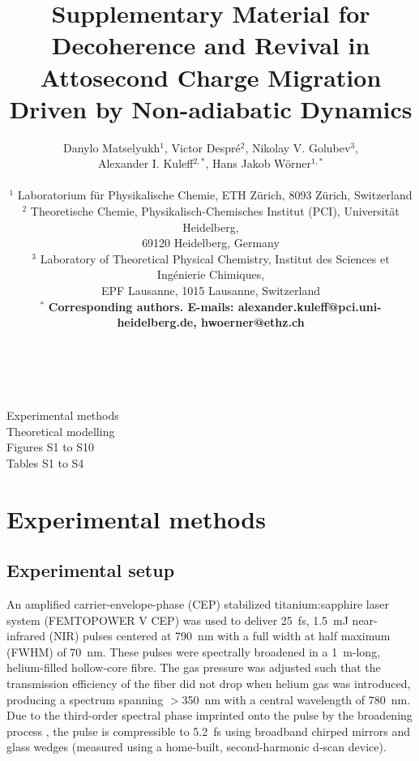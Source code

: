 \documentclass[12pt]{article}
\title{Supplementary Material for
\\ \bf Decoherence and Revival in Attosecond Charge Migration Driven by Non-adiabatic Dynamics}
\author
{Danylo Matselyukh$^1$, Victor Despr\'e$^2$, Nikolay V. Golubev$^3$, \\
Alexander I. Kuleff$^{2,\ast}$, Hans Jakob W{\"o}rner$^{1,\ast}$\\
 \\
\normalsize{$^{1}$ Laboratorium f\"{u}r Physikalische Chemie, ETH Z\"{u}rich, 8093 Z\"{u}rich, Switzerland}\\
\normalsize{$^{2}$ Theoretische Chemie, Physikalisch-Chemisches Institut (PCI), Universit\"at Heidelberg,}\\
\normalsize{69120 Heidelberg, Germany}\\
\normalsize{$^{3}$ Laboratory of Theoretical Physical Chemistry, Institut des Sciences et Ing\'enierie Chimiques,} \\
\normalsize{EPF Lausanne, 1015 Lausanne, Switzerland}\\
\normalsize{$^\ast$ \textbf{Corresponding authors. E-mails: alexander.kuleff@pci.uni-heidelberg.de, hwoerner@ethz.ch}}\\
\\
}
\date{}
\begin{document}
\baselineskip24pt

\maketitle

\\
\noindent Experimental methods\\
Theoretical modelling \\
Figures S1 to S10 \\
Tables S1 to S4 \\

\newpage
\tableofcontents

\renewcommand{\thefigure}{S\arabic{figure}}
\renewcommand{\thetable}{S\arabic{table}}
\renewcommand{\thesection}{S\arabic{section}}

\clearpage
\section{Experimental methods}

\subsection{Experimental setup}

An amplified carrier-envelope-phase (CEP) stabilized titanium:sapphire laser system (FEMTOPOWER V CEP) was used to deliver 25~fs, 1.5~mJ near-infrared (NIR) pulses centered at 790~nm with a full width at half maximum (FWHM) of 70~nm. These pulses were spectrally broadened in a 1~m-long, helium-filled hollow-core fibre. The gas pressure was adjusted such that the transmission efficiency of the fiber did not drop when helium gas was introduced, producing a spectrum spanning $>$350~nm with a central wavelength of 780~nm. Due to the third-order spectral phase imprinted onto the pulse by the broadening process \cite{jarque2018}, the pulse is compressible to 5.2~fs using broadband chirped mirrors and glass wedges (measured using a home-built, second-harmonic d-scan device). 
\end{document}
